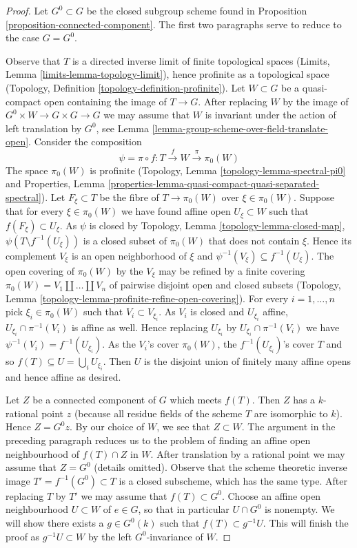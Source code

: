 \begin{proof}
Let $G^0 \subset G$ be the closed subgroup scheme found in
Proposition \ref{proposition-connected-component}. The first two paragraphs
serve to reduce to the case $G = G^0$.

\medskip\noindent
Observe that $T$ is a directed inverse limit of finite topological spaces
(Limits, Lemma \ref{limits-lemma-topology-limit}), hence profinite as a
topological space (Topology, Definition \ref{topology-definition-profinite}).
Let $W \subset G$ be a quasi-compact open containing the image of $T \to G$.
After replacing $W$ by the image of $G^0 \times W \to G \times G \to G$ we may
assume that $W$ is invariant under the action of left translation by $G^0$, see
Lemma \ref{lemma-group-scheme-over-field-translate-open}.
Consider the composition
$$
\psi = \pi \circ f : T \xrightarrow{f} W \xrightarrow{\pi} \pi_0(W)
$$
The space $\pi_0(W)$ is profinite
(Topology, Lemma \ref{topology-lemma-spectral-pi0} and
Properties, Lemma
\ref{properties-lemma-quasi-compact-quasi-separated-spectral}).
Let $F_\xi \subset T$ be the fibre of $T \to \pi_0(W)$ over $\xi \in \pi_0(W)$.
Suppose that for every $\xi \in \pi_0(W)$ we have found affine open
$U_\xi \subset W$ such that $f(F_\xi) \subset U_\xi$. As $\psi$ is closed by
Topology, Lemma \ref{topology-lemma-closed-map},
$\psi(T \setminus f^{-1}(U_\xi))$ is a closed subset of $\pi_0(W)$
that does not contain $\xi$. Hence its complement $V_\xi$ is an
open neighborhood of $\xi$ and $\psi^{-1}(V_\xi) \subseteq f^{-1}(U_\xi)$.
The open covering of $\pi_0(W)$ by the $V_\xi$ may be refined by
a finite covering $\pi_0(W) = V_1 \amalg \ldots \amalg V_n$
of pairwise disjoint open and closed subsets (Topology,
Lemma \ref{topology-lemma-profinite-refine-open-covering}).
For every $i = 1, \ldots, n$ pick $\xi_i \in \pi_0(W)$
such that $V_i \subset V_{\xi_i}$. As $V_i$ is closed and
$U_{\xi_i}$ affine, $U_{\xi_i} \cap \pi^{-1}(V_i)$ is affine as well.
Hence replacing $U_{\xi_i}$ by $U_{\xi_i} \cap \pi^{-1}(V_i)$ we
have $\psi^{-1}(V_i) = f^{-1}(U_{\xi_i})$. As the $V_i$'s cover
$\pi_0(W)$, the $f^{-1}(U_{\xi_i})$'s cover $T$ and so
$f(T) \subseteq U = \bigcup_i U_{\xi_i}$. Then $U$ is the disjoint
union of finitely many affine opens and hence affine as desired.

\medskip\noindent
Let $Z$ be a connected component of $G$ which meets $f(T)$. Then $Z$
has a $k$-rational point $z$ (because all residue fields of the scheme $T$
are isomorphic to $k$). Hence $Z = G^0 z$. By our choice of $W$, we see
that $Z \subset W$. The argument in the preceding paragraph reduces us to
the problem of finding an affine open neighbourhood of $f(T) \cap Z$ in $W$.
After translation by a rational point we may assume that $Z = G^0$
(details omitted). Observe that the scheme theoretic inverse image
$T' = f^{-1}(G^0) \subset T$ is a closed subscheme, which has the same type.
After replacing $T$ by $T'$ we may assume that $f(T) \subset G^0$.
Choose an affine open neighbourhood $U \subset W$
of $e \in G$, so that in particular $U \cap G^0$ is nonempty. We will show
there exists a $g \in G^0(k)$ such that $f(T) \subset g^{-1}U$.
This will finish the proof as $g^{-1}U \subset W$ by the left
$G^0$-invariance of $W$.


\end{proof}
